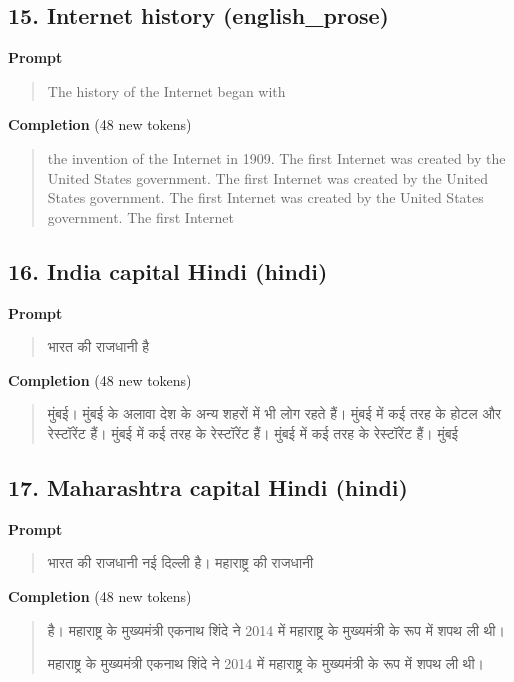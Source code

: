 \documentclass[10pt,a4paper]{article}
\begin{document}
\subsection*{15. Internet history (english\_prose)}
\textbf{Prompt}\par
\begin{quote}\small\raggedright  The history of the Internet began with\par\end{quote}
\textbf{Completion} (48 new tokens)\par
\begin{quote}\small\raggedright  \hspace*{0.5em}the invention of the Internet in 1909. The first Internet was created by the United States government. The first Internet was created by the United States government. The first Internet was created by the United States government. The first Internet\par\end{quote}
\filbreak
\subsection*{16. India capital Hindi (hindi)}
\textbf{Prompt}\par
\begin{quote}\small\raggedright \devanagarifont भारत की राजधानी है\par\end{quote}
\textbf{Completion} (48 new tokens)\par
\begin{quote}\small\raggedright \devanagarifont मुंबई। मुंबई के अलावा देश के अन्य शहरों में भी लोग रहते हैं। मुंबई में कई तरह के होटल और रेस्टॉरेंट हैं। मुंबई में कई तरह के रेस्टॉरेंट हैं। मुंबई में कई तरह के रेस्टॉरेंट हैं। मुंबई\par\end{quote}
\filbreak
\subsection*{17. Maharashtra capital Hindi (hindi)}
\textbf{Prompt}\par
\begin{quote}\small\raggedright \devanagarifont भारत की राजधानी नई दिल्ली है। महाराष्ट्र की राजधानी\par\end{quote}
\textbf{Completion} (48 new tokens)\par
\begin{quote}\small\raggedright \devanagarifont है। महाराष्ट्र के मुख्यमंत्री एकनाथ शिंदे ने 2014 में महाराष्ट्र के मुख्यमंत्री के रूप में शपथ ली थी।\par\noindent \hspace*{0.5em}महाराष्ट्र के मुख्यमंत्री एकनाथ शिंदे ने 2014 में महाराष्ट्र के मुख्यमंत्री के रूप में शपथ ली थी।\par\noindent [space]\par\end{quote}
\filbreak
\end{document}
